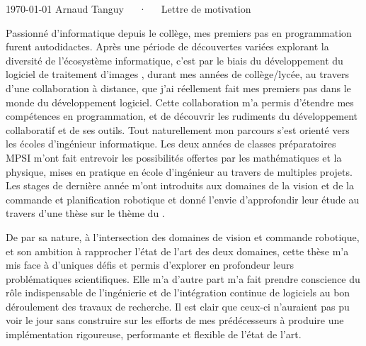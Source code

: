 \documentclass[11pt, a4paper]{awesome-cv}
\begin{document}
\makecvheader[R]

\makecvfooter
{\today}
{Arnaud Tanguy~~~·~~~Lettre de motivation}
{}

\makelettertitle

\begin{cvletter}

  Passionné d'informatique depuis le collège, mes premiers pas en programmation furent autodidactes. Après
  une période de découvertes variées explorant la diversité de l'écosystème informatique, c'est par le biais
  du développement du logiciel  de traitement d'images ,
  durant mes années de collège/lycée, au travers d'une collaboration à distance, que j'ai réellement fait mes
  premiers pas dans le monde du développement logiciel. Cette collaboration m'a permis d'étendre mes
  compétences en programmation, et de découvrir les rudiments du développement collaboratif et de ses outils.
  Tout naturellement mon parcours s'est orienté vers les écoles d'ingénieur informatique. Les deux années de
  classes préparatoires MPSI m'ont fait entrevoir les possibilités offertes par les mathématiques et la
  physique, mises en pratique en école d'ingénieur au travers de multiples projets. Les stages de dernière
  année m'ont introduits aux domaines de la vision et de la commande et planification robotique et donné
  l'envie d'approfondir leur étude au travers d'une thèse sur le thème du .

  De par sa nature, à l'intersection des domaines de vision et commande robotique, et son ambition à
  rapprocher l'état de l'art des deux domaines, cette thèse m'a mis face à d'uniques défis et permis
  d'explorer en profondeur leurs problématiques scientifiques. Elle m'a d'autre part m'a fait prendre
  conscience du rôle indispensable de l'ingénierie et de l'intégration continue de logiciels au bon
  déroulement des travaux de recherche. Il est clair que ceux-ci n'auraient pas pu voir le jour sans
  construire sur les efforts de mes prédécesseurs à produire une implémentation rigoureuse, performante et
  flexible de l'état de l'art.


\end{cvletter}
\end{document}
